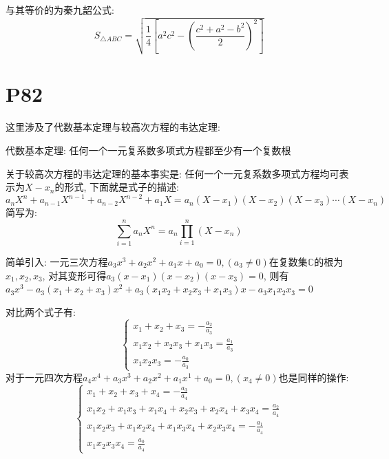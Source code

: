 \documentclass{book}
\begin{document}
    与其等价的为\textcolor[rgb]{0.38,0.11,0.2}{秦九韶公式}:
    $$S_{\triangle ABC}=\sqrt{\frac{1}{4}\left[ a^2c^2-\left( \frac{c^2+a^2-b^2}{2} \right)^2 \right]}$$
    \section{\textcolor[rgb]{0.11,0.65,0.52}{P82}}
    这里涉及了\textcolor[rgb]{0.38,0.11,0.2}{代数基本定理}与\textcolor[rgb]{0.38,0.11,0.2}{较高次方程的韦达定理}:
    \begin{boxB}
        代数基本定理: 任何一个一元复系数多项式方程都至少有一个复数根
    \end{boxB}
    关于较高次方程的韦达定理的基本事实是: 任何一个一元复系数多项式方程均可表示为$X-x_n$的形式, 下面就是式子的描述:
    $$a_nX^n+a_{n-1}X^{n-1}+a_{n-2}X^{n-2}+a_1X=a_n(X-x_1)(X-x_2)(X-x_3)\cdots (X-x_n)$$
    简写为:
    $$\sum_{i=1}^{n} a_nX^{n}=a_n\prod_{i=1}^{n}\left ( X-x_n \right ) $$

    简单引入: 一元三次方程$a_3x^3+a_2x^2+a_1x+a_0=0,(a_3\neq0)$在复数集$\mathbb{C}$的根为$x_1,x_2,x_3$, 对其变形可得$a_3(x-x_1)(x-x_2)(x-x_3)=0$, 则有$a_3x^3-a_3(x_1+x_2+x_3)x^2+a_3(x_1x_2+x_2x_3+x_1x_3)x-a_3x_1x_2x_3=0$

    \textcolor[rgb]{0.75,0.17,0.22}{对比两个式子}有:
    $$
        \left\{\begin{matrix}
            \displaystyle x_1+x_2+x_3=-\frac{a_2}{a_3}         \\
            \displaystyle x_1x_2+x_2x_3+x_1x_3=\frac{a_1}{a_3} \\
            \displaystyle x_1x_2x_3=-\frac{a_0}{a_3}
        \end{matrix}\right.
    $$
    对于一元四次方程$a_4x^4+a_3x^3+a_2x^2+a_1x^1+a_0=0,\left( x_4 \neq 0 \right)$也是同样的操作:
    $$
        \left\{\begin{matrix}
            \displaystyle x_1+x_2+x_3+x_4=-\frac{a_3}{a_4}                          \\
            \displaystyle x_1x_2+x_1x_3+x_1x_4+x_2x_3+x_2x_4+x_3x_4=\frac{a_2}{a_4} \\
            \displaystyle x_1x_2x_3+x_1x_2x_4+x_1x_3x_4+x_2x_3x_4=-\frac{a_1}{a_4}  \\
            \displaystyle x_1x_2x_3x_4=\frac{a_0}{a_4}
        \end{matrix}\right.
    $$
\end{document}
